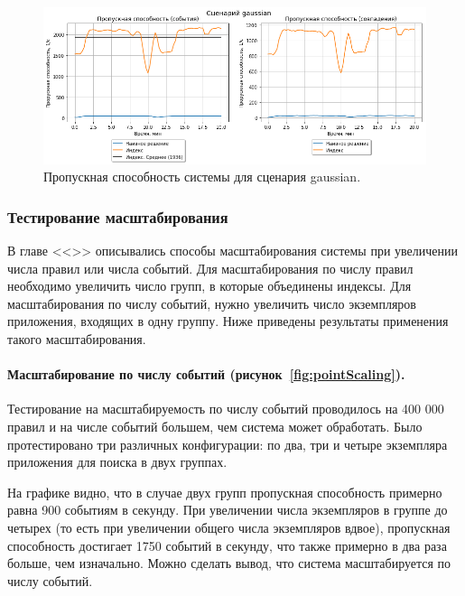 \documentclass[14pt]{article}
\begin{document}
\begin{figure}[h!]
    \centering
    \includegraphics[width=1\textwidth]{images/composite/gaussianComposite.png}
    \caption{Пропускная способность системы для сценария gaussian.}
    \label{fig:gaussianComposite}
\end{figure}

\subsubsection{Тестирование масштабирования}
В главе <<>> описывались способы масштабирования системы при увеличении числа правил или числа событий. Для масштабирования по числу правил необходимо увеличить число групп, в которые объединены индексы. Для масштабирования по числу событий, нужно увеличить число экземпляров приложения, входящих в одну группу. Ниже приведены результаты применения такого масштабирования.

\paragraph{Масштабирование по числу событий (рисунок~\ref{fig:pointScaling}).} Тестирование на масштабируемость по числу событий проводилось на 400 000 правил и на числе событий большем, чем система может обработать. Было протестировано три различных конфигурации: по два, три и четыре экземпляра приложения для поиска в двух группах.

На графике видно, что в случае двух групп пропускная способность примерно равна 900 событиям в секунду. При увеличении числа экземпляров в группе до четырех (то есть при увеличении общего числа экземпляров вдвое), пропускная способность достигает 1750 событий в секунду, что также примерно в два раза больше, чем изначально. Можно сделать вывод, что система масштабируется по числу событий.
\end{document}
